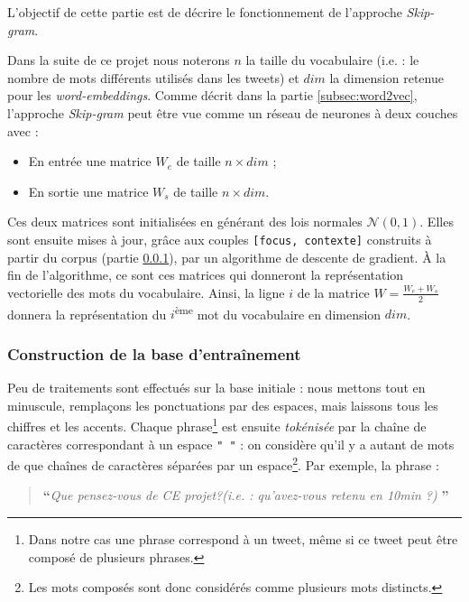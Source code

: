 \documentclass[11pt,french,french]{article}
\let\rmarkdownfootnote\footnote%
\def\footnote{\protect\rmarkdownfootnote}
\begin{document}
L'objectif de cette partie est de décrire le fonctionnement de
l'approche \emph{Skip-gram}.

Dans la suite de ce projet nous noterons \(n\) la taille du vocabulaire
(i.e. : le nombre de mots différents utilisés dans les tweets) et
\(dim\) la dimension retenue pour les \emph{word-embeddings}. Comme
décrit dans la partie \ref{subsec:word2vec}, l'approche \emph{Skip-gram}
peut être vue comme un réseau de neurones à deux couches avec :

\begin{itemize}
\item
  En entrée une matrice \(W_e\) de taille \(n\times dim\) ;
\item
  En sortie une matrice \(W_s\) de taille \(n\times dim\).
\end{itemize}

Ces deux matrices sont initialisées en générant des lois normales
\(\mathcal N(0,1)\). Elles sont ensuite mises à jour, grâce aux couples
\texttt{{[}focus,\ contexte{]}} construits à partir du corpus (partie
\ref{subsec:baseentrainement}), par un algorithme de descente de
gradient. À la fin de l'algorithme, ce sont ces matrices qui donneront
la représentation vectorielle des mots du vocabulaire. Ainsi, la ligne
\(i\) de la matrice \(W=\frac{W_e+W_s}{2}\) donnera la représentation du
\(i\)\textsuperscript{ème} mot du vocabulaire en dimension \(dim\).

\subsubsection{Construction de la base
d'entraînement}\label{subsec:baseentrainement}

Peu de traitements sont effectués sur la base initiale : nous mettons
tout en minuscule, remplaçons les ponctuations par des espaces, mais
laissons tous les chiffres et les accents. Chaque phrase\footnote{Dans
  notre cas une phrase correspond à un tweet, même si ce tweet peut être
  composé de plusieurs phrases.} est ensuite \emph{tokénisée} par la
chaîne de caractères correspondant à un espace \texttt{"\ "} : on
considère qu'il y a autant de mots de que chaînes de caractères séparées
par un espace\footnote{Les mots composés sont donc considérés comme
  plusieurs mots distincts.}. Par exemple, la phrase :

\begin{quote}
\LARGE \textbf{``}\normalsize \emph{Que pensez-vous de CE projet?(i.e. : qu'avez-vous retenu en 10min ?)} \LARGE \textbf{''}\normalsize
\end{quote}
\end{document}
